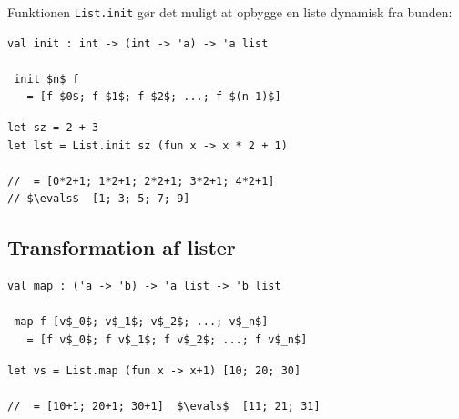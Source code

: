 \documentclass[rgb]{beamer}
\begin{document}
\begin{frame}[fragile]
\begin{footnotesize}


  \vspace{1ex}

  Funktionen \lstinline{List.init} gør det muligt at opbygge en liste
  dynamisk fra bunden:

\begin{lstlisting}[numbers=none,frame=none,mathescape]
val init : int -> (int -> 'a) -> 'a list

 init $n$ f
   = [f $0$; f $1$; f $2$; ...; f $(n-1)$]
\end{lstlisting}

  \vspace{1ex}


\begin{lstlisting}[numbers=none,frame=none,mathescape]
let sz = 2 + 3
let lst = List.init sz (fun x -> x * 2 + 1)

//  = [0*2+1; 1*2+1; 2*2+1; 3*2+1; 4*2+1]
// $\evals$  [1; 3; 5; 7; 9]
\end{lstlisting}

\end{footnotesize}
\end{frame}

\subsection{Transformation af lister}

\begin{frame}[fragile]
\begin{footnotesize}
\vspace{0.5ex}

\begin{lstlisting}[numbers=none,frame=none,mathescape]
val map : ('a -> 'b) -> 'a list -> 'b list

 map f [v$_0$; v$_1$; v$_2$; ...; v$_n$]
   = [f v$_0$; f v$_1$; f v$_2$; ...; f v$_n$]
\end{lstlisting}

\vspace{0.5ex}
\begin{lstlisting}[numbers=none,frame=none,mathescape]
let vs = List.map (fun x -> x+1) [10; 20; 30]

//  = [10+1; 20+1; 30+1]  $\evals$  [11; 21; 31]
\end{lstlisting}

\end{footnotesize}
\end{frame}
\end{document}

